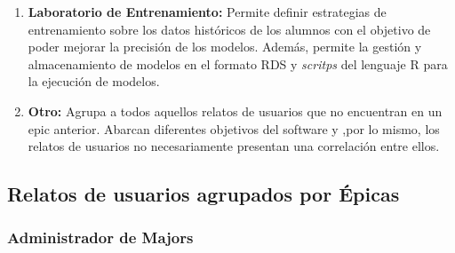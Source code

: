 \begin{enumerate}
	\item \textbf{Laboratorio de Entrenamiento:} Permite definir estrategias de entrenamiento sobre los datos históricos de los alumnos con el objetivo de poder mejorar la precisión de los modelos. Además, permite la gestión y almacenamiento de modelos en el formato RDS y \textit{scritps}  del lenguaje R para la ejecución de modelos.
	\item \textbf{Otro:} Agrupa a todos aquellos relatos de usuarios que no encuentran en un epic anterior. Abarcan diferentes objetivos del software y ,por lo mismo, los relatos de usuarios no necesariamente presentan una correlación entre ellos.
\end{enumerate}

\subsection{Relatos de usuarios agrupados por Épicas \label{sec:detailed_user_stories}}

\subsubsection{Administrador de Majors}


